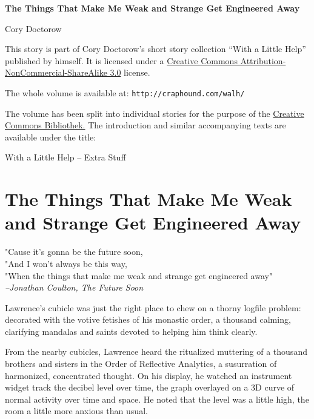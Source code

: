 


\raggedbottom

\begin{center}
\textbf{\huge\textsf{The Things That Make Me Weak and Strange Get 
Engineered Away}}

\medskip
Cory Doctorow

\end{center}

\bigskip

\begin{flushleft}
This story is part of Cory Doctorow’s short story collection
“With a Little Help” published by himself. It is licensed under a
\href{http://creativecommons.org/licenses/by-nc-sa/}
{Creative Commons Attribution-NonCommercial-ShareAlike 3.0} license.

\bigskip

The whole volume is available at:
\texttt{http://craphound.com/walh/}

\medskip

The volume has been split into individual stories for the purpose of the
\href{http://ccbib.org}{Creative Commons Bibliothek.}
The introduction and similar accompanying texts are available under the 
title:
\end{flushleft}
\begin{center}
With a Little Help -- Extra Stuff
\end{center}

\newpage
\section{The Things That Make Me Weak and Strange Get Engineered Away}
\begin{flushleft}
\small
\textsf{"Cause it's gonna be the future soon,\\
"And I won't always be this way,\\
"When the things that make me weak and strange get engineered away"\\
}
\hfill \textit{--Jonathan Coulton, The Future Soon}
\end{flushleft}

Lawrence's cubicle was just the right place to chew on a thorny logfile 
problem: decorated with the votive fetishes of his monastic order, a 
thousand calming, clarifying mandalas and saints devoted to helping him 
think clearly.

From the nearby cubicles, Lawrence heard the ritualized muttering of a 
thousand brothers and sisters in the Order of Reflective Analytics, a 
susurration of harmonized, concentrated thought. On his display, he 
watched an instrument widget track the decibel level over time, the 
graph overlayed on a 3D curve of normal activity over time and space. 
He noted that the level was a little high, the room a little more 
anxious than usual.

